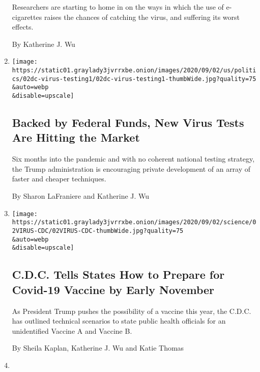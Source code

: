 \begin{enumerate}
  Researchers are starting to home in on the ways in which the use of
  e-cigarettes raises the chances of catching the virus, and suffering
  its worst effects.

  By Katherine J. Wu
\item
  \href{/2020/09/02/us/politics/covid-testing.html}{}

  \texttt{[image: https://static01.graylady3jvrrxbe.onion/images/2020/09/02/us/politics/02dc-virus-testing1/02dc-virus-testing1-thumbWide.jpg?quality=75\\\&auto=webp\\\&disable=upscale]}

  \hypertarget{backed-by-federal-funds-new-virus-tests-are-hitting-the-market}{%
  \subsection{Backed by Federal Funds, New Virus Tests Are Hitting the
  Market}\label{backed-by-federal-funds-new-virus-tests-are-hitting-the-market}}

  Six months into the pandemic and with no coherent national testing
  strategy, the Trump administration is encouraging private development
  of an array of faster and cheaper techniques.

  By Sharon LaFraniere and Katherine J. Wu
\item
  \href{/2020/09/02/health/covid-19-vaccine-cdc-plans.html}{}

  \texttt{[image: https://static01.graylady3jvrrxbe.onion/images/2020/09/02/science/02VIRUS-CDC/02VIRUS-CDC-thumbWide.jpg?quality=75\\\&auto=webp\\\&disable=upscale]}

  \hypertarget{cdc-tells-states-how-to-prepare-for-covid-19-vaccine-by-early-november}{%
  \subsection{C.D.C. Tells States How to Prepare for Covid-19 Vaccine by
  Early
  November}\label{cdc-tells-states-how-to-prepare-for-covid-19-vaccine-by-early-november}}

  As President Trump pushes the possibility of a vaccine this year, the
  C.D.C. has outlined technical scenarios to state public health
  officials for an unidentified Vaccine A and Vaccine B.

  By Sheila Kaplan, Katherine J. Wu and Katie Thomas
\item
  \href{/2020/08/28/us/elections/trump-made-false-and-misleading-claims-about-the-coronavirus-the-economy-himself-and-his-opponent.html}{}


\end{enumerate}
